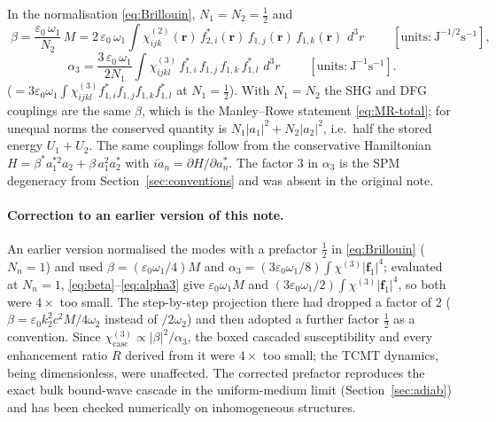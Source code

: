 \documentclass[11pt,a4paper]{article}
\newcommand{\eps}{\varepsilon}
\newcommand{\bvec}[1]{\mathbf{#1}}
\newcommand{\f}{\bvec{f}}
\newcommand{\ri}{\bvec{r}}
\newcommand{\dthreer}{\,d^{3}r}
\newcommand{\chitwo}{\chi^{(2)}}
\newcommand{\chithree}{\chi^{(3)}}
\begin{document}
In the normalisation \eqref{eq:Brillouin}, $N_1=N_2=\tfrac12$ and
\begin{equation}
  \boxed{\;\beta=\frac{\eps_0\,\omega_1}{N_2}\,M
              =2\,\eps_0\,\omega_1\!\int\!\chitwo_{ijk}(\ri)\,
                f_{2,i}^*(\ri)\,f_{1,j}(\ri)\,f_{1,k}(\ri)\,\dthreer\;}
  \qquad[\text{units:}\ \mathrm{J}^{-1/2}\mathrm{s}^{-1}],
\label{eq:beta}
\end{equation}
\begin{equation}
  \boxed{\;\alpha_3=\frac{3\,\eps_0\,\omega_1}{2N_1}\!\int\!\chithree_{ijkl}\,
                  f_{1,i}^*\,f_{1,j}\,f_{1,k}\,f_{1,l}^*\,\dthreer\;}
  \qquad[\text{units:}\ \mathrm{J}^{-1}\mathrm{s}^{-1}].
\label{eq:alpha3}
\end{equation}
($=3\eps_0\omega_1\int\chithree_{ijkl}f_{1,i}^*f_{1,j}f_{1,k}f_{1,l}^*$
at $N_1=\tfrac12$).  With $N_1=N_2$ the SHG and DFG couplings are the
same $\beta$, which is
the Manley--Rowe statement \eqref{eq:MR-total}; for unequal norms the
conserved quantity is $N_1|a_1|^2+N_2|a_2|^2$, i.e.\ half the stored
energy $U_1+U_2$.
The same couplings follow from the conservative Hamiltonian
$H=\beta^{*}a_1^{*2}a_2+\beta\,a_1^{2}a_2^{*}$ with
$i\dot a_n=\partial H/\partial a_n^{*}$.  The factor $3$ in $\alpha_3$
is the SPM degeneracy from Section~\ref{sec:conventions} and was absent
in the original note.

\paragraph{Correction to an earlier version of this note.}  An earlier
version normalised the modes with a prefactor $\tfrac12$ in
\eqref{eq:Brillouin} ($N_n=1$) and used $\beta=(\eps_0\omega_1/4)M$ and
$\alpha_3=(3\eps_0\omega_1/8)\int\chithree|\f_1|^4$; evaluated at
$N_n=1$, \eqref{eq:beta}--\eqref{eq:alpha3} give $\eps_0\omega_1M$ and
$(3\eps_0\omega_1/2)\int\chithree|\f_1|^4$, so both were $4\times$ too
small.  The step-by-step projection there had dropped a factor of $2$
($\beta=\eps_0k_2^2c^2M/4\omega_2$ instead of $/2\omega_2$) and then
adopted a further factor $\tfrac12$ as a convention.  Since
$\chithree_\text{casc}\propto|\beta|^2/\alpha_3$, the boxed cascaded
susceptibility and every enhancement ratio $R$ derived from it were
$4\times$ too small; the TCMT dynamics, being dimensionless, were
unaffected.  The corrected prefactor reproduces the exact bulk
bound-wave cascade in the uniform-medium limit (Section~\ref{sec:adiab})
and has been checked numerically on inhomogeneous structures.
\end{document}
